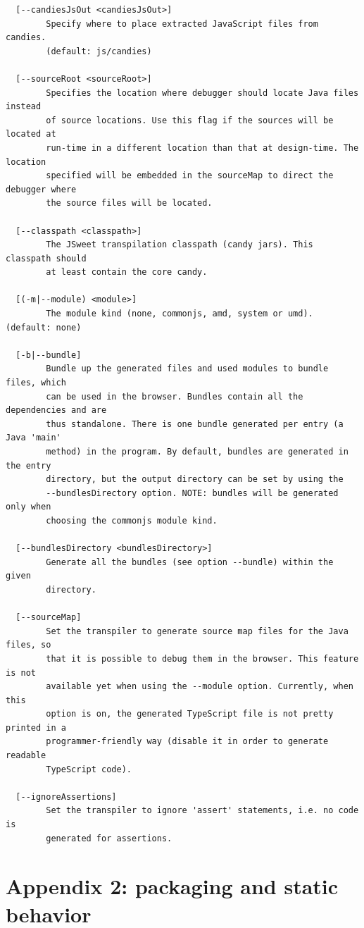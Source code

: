 \documentclass[a4paper]{report}
\begin{document}
\begin{small}
\begin{verbatim}
  [--candiesJsOut <candiesJsOut>]
        Specify where to place extracted JavaScript files from candies.
        (default: js/candies)

  [--sourceRoot <sourceRoot>]
        Specifies the location where debugger should locate Java files instead
        of source locations. Use this flag if the sources will be located at
        run-time in a different location than that at design-time. The location
        specified will be embedded in the sourceMap to direct the debugger where
        the source files will be located.

  [--classpath <classpath>]
        The JSweet transpilation classpath (candy jars). This classpath should
        at least contain the core candy.

  [(-m|--module) <module>]
        The module kind (none, commonjs, amd, system or umd). (default: none)

  [-b|--bundle]
        Bundle up the generated files and used modules to bundle files, which
        can be used in the browser. Bundles contain all the dependencies and are
        thus standalone. There is one bundle generated per entry (a Java 'main'
        method) in the program. By default, bundles are generated in the entry
        directory, but the output directory can be set by using the
        --bundlesDirectory option. NOTE: bundles will be generated only when
        choosing the commonjs module kind.

  [--bundlesDirectory <bundlesDirectory>]
        Generate all the bundles (see option --bundle) within the given
        directory.

  [--sourceMap]
        Set the transpiler to generate source map files for the Java files, so
        that it is possible to debug them in the browser. This feature is not
        available yet when using the --module option. Currently, when this
        option is on, the generated TypeScript file is not pretty printed in a
        programmer-friendly way (disable it in order to generate readable
        TypeScript code).

  [--ignoreAssertions]
        Set the transpiler to ignore 'assert' statements, i.e. no code is
        generated for assertions.
\end{verbatim}
\end{small}
       
\chapter*{Appendix 2: packaging and static behavior}
\label{static_behavior}
\end{document}
